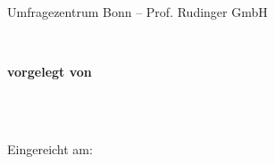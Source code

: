\begin{titlepage}
    \begin{Large}
        \begin{flushleft}
        \end{flushleft}
    \end{Large}

    \vspace{0.150\textheight}
    \begin{center}
        \begin{Huge}
            \textbf{\ThesisSubjectType}
        \end{Huge}\\
        \vspace{2em}
        \begin{Large}
           Umfragezentrum Bonn – Prof. Rudinger GmbH
        \end{Large}
        \vspace{0.10\textheight}\\
        \begin{large}
            \textbf{vorgelegt von}
        \end{large}\\
        \vspace{1em}
        \begin{Large}
            \textbf{\ThesisAuthor}\\
              Eingereicht am:            \ThesisPubDate
        \end{Large}\\
    \end{center}
    \vspace{0.100\textheight}


\end{titlepage}
